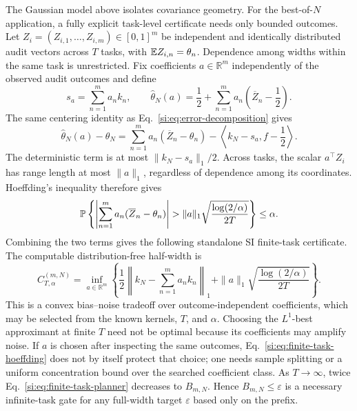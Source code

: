 The Gaussian model above isolates covariance geometry. For the best-of-$N$ application, a fully explicit task-level certificate needs only bounded outcomes. Let $Z_i=(Z_{i,1},\ldots,Z_{i,m})\in[0,1]^m$ be independent and identically distributed audit vectors across $T$ tasks, with $\mathbb{E} Z_{i,n}=\theta_n$. Dependence among widths within the same task is unrestricted. Fix coefficients $a\in\mathbb R^m$ independently of the observed audit outcomes and define
\begin{equation}
s_a=\sum_{n=1}^ma_nk_n,
\qquad
\widehat\theta_N(a)=\frac12+\sum_{n=1}^ma_n
\left(\overline Z_n-\frac12\right).
\label{si:eq:finite-task-estimator}
\end{equation}
The same centering identity as Eq.~\ref{si:eq:error-decomposition} gives
\begin{equation}
\widehat\theta_N(a)-\theta_N
=\sum_{n=1}^ma_n(\overline Z_n-\theta_n)
-\left\langle k_N-s_a,f-\frac12\right\rangle.
\label{si:eq:finite-task-decomposition}
\end{equation}
The deterministic term is at most $\|k_N-s_a\|_1/2$. Across tasks, the scalar $a^\top Z_i$ has range length at most $\|a\|_1$, regardless of dependence among its coordinates. Hoeffding's inequality therefore gives
\begin{equation}
\mathbb{P}\left\{
\left|\sum_{n=1}^ma_n(\overline Z_n-\theta_n)\right|
>\|a\|_1\sqrt{\frac{\log(2/\alpha)}{2T}}
\right\}\le\alpha.
\label{si:eq:finite-task-hoeffding}
\end{equation}
Combining the two terms gives the following standalone SI finite-task certificate. The computable distribution-free half-width is
\begin{equation}
C_{T,\alpha}^{(m,N)}
=\inf_{a\in\mathbb R^m}
\left\{
\frac12\left\|k_N-\sum_{n=1}^ma_nk_n\right\|_1
+\|a\|_1\sqrt{\frac{\log(2/\alpha)}{2T}}
\right\}.
\label{si:eq:finite-task-planner}
\end{equation}
This is a convex bias--noise tradeoff over outcome-independent coefficients, which may be selected from the known kernels, $T$, and $\alpha$. Choosing the $L^1$-best approximant at finite $T$ need not be optimal because its coefficients may amplify noise. If $a$ is chosen after inspecting the same outcomes, Eq.~\ref{si:eq:finite-task-hoeffding} does not by itself protect that choice; one needs sample splitting or a uniform concentration bound over the searched coefficient class. As $T\to\infty$, twice Eq.~\ref{si:eq:finite-task-planner} decreases to $B_{m,N}$. Hence $B_{m,N}\le\varepsilon$ is a necessary infinite-task gate for any full-width target $\varepsilon$ based only on the prefix.


